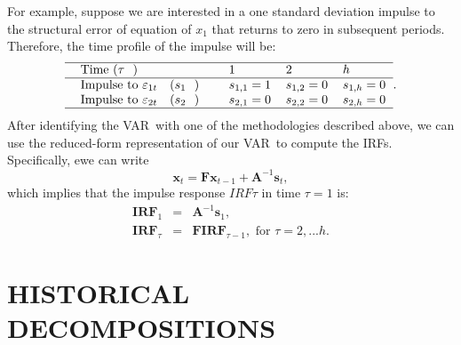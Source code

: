 \documentclass[11pt,a4paper]{report}
\numberwithin{equation}{chapter}
\numberwithin{section}{chapter}
\begin{document}
For example, suppose we are interested in a one standard deviation impulse
to the structural error of equation of $x_{1}$ that returns to zero in
subsequent periods. Therefore, the time profile of the impulse will be:%
\begin{equation*}
\begin{tabular}{lllll}
\hline
$\text{Time (}\tau \text{)}$ &  & $1$ & $2$ & $h$ \\ \hline
$\text{Impulse to }\varepsilon _{1t}\text{ (}s_{1}\text{)}$ &  & $s_{1,1}=1$
& $s_{1,2}=0$ & $s_{1,h}=0$ \\ 
$\text{Impulse to }\varepsilon _{2t}\text{ (}s_{2}\text{)}$ &  & $s_{2,1}=0$
& $s_{2,2}=0$ & $s_{2,h}=0$ \\ \hline
\end{tabular}%
.
\end{equation*}%
After identifying the VAR\ with one of the methodologies described above, we
can use the reduced-form representation of our VAR\ to compute the IRFs.
Specifically, ewe can write%
\begin{equation*}
\mathbf{x}_{t}=\mathbf{Fx}_{t-1}+\mathbf{A}^{-1}\mathbf{s}_{t},
\end{equation*}%
which implies that the impulse response $IRF\tau $ in time $\tau =1$ is:%
\begin{eqnarray*}
\mathbf{IRF}_{1} &=&\mathbf{A}^{-1}\mathbf{s}_{1}, \\
\mathbf{IRF}_{\tau } &=&\mathbf{FIRF}_{\tau -1},\text{ \ \ \ \ for }\tau
=2,...h.
\end{eqnarray*}

\chapter{HISTORICAL DECOMPOSITIONS}
\end{document}
